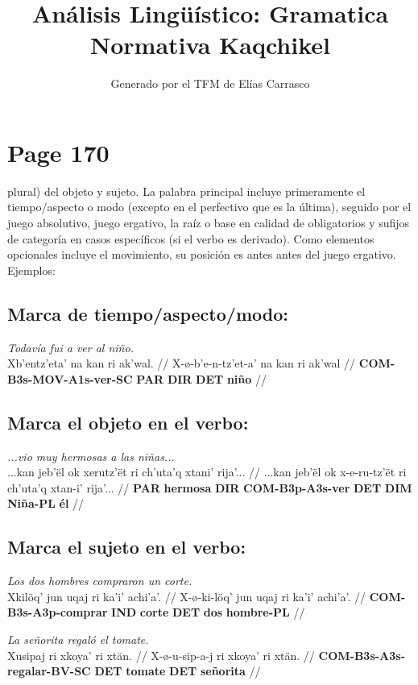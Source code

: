 \documentclass{article}%
\title{Análisis Lingüístico: Gramatica Normativa Kaqchikel}%
\author{Generado por el TFM de Elías Carrasco}%
\begin{document}
%
\normalsize%
\maketitle%
\section{Page 170}%
\label{sec:Page170}%
plural) del objeto y sujeto. La palabra principal incluye primeramente el tiempo/aspecto o modo (excepto en el perfectivo que es la última), seguido por el juego absolutivo, juego ergativo, la raíz o base en calidad de obligatorios y sufijos de categoría en casos específicos (si el verbo es derivado). Como elementos opcionales incluye el movimiento, su posición es antes antes del juego ergativo. Ejemplos: %
\subsection{Marca de tiempo/aspecto/modo:}%
\label{subsec:Marcadetiempo/aspecto/modo}%

%
\par\medskip%
\ex
\textit{Todavía fui a ver al niño.} \\
\begingl
\gla Xb'entz'eta' na kan ri ak'wal. //
\glb X-ø-b'e-n-tz'et-a' na kan ri ak'wal //
\glc \textbf{COM-B3s-MOV-A1s-ver-SC} \textbf{PAR} \textbf{DIR} \textbf{DET} \textbf{niño} //
\endgl
\xe
%
\medskip%
\subsection{Marca el objeto en el verbo:}%
\label{subsec:Marcaelobjetoenelverbo}%

%
\par\medskip%
\ex
\textit{...vio muy hermosas a las niñas...} \\
\begingl
\gla ...kan jeb'ël ok xerutz'ët ri ch'uta'q xtani' rija'... //
\glb ...kan jeb'ël ok x-e-ru-tz'ët ri ch'uta'q xtan-i' rija'... //
\glc \textbf{PAR} \textbf{hermosa} \textbf{DIR} \textbf{COM-B3p-A3s-ver} \textbf{DET} \textbf{DIM} \textbf{Niña-PL} \textbf{él} //
\endgl
\xe
%
\medskip%
\subsection{Marca el sujeto en el verbo:}%
\label{subsec:Marcaelsujetoenelverbo}%

%
\par\medskip%
\ex
\textit{Los dos hombres compraron un corte.} \\
\begingl
\gla Xkilöq' jun uqaj ri ka'i' achi'a'. //
\glb X-ø-ki-löq' jun uqaj ri ka'i' achi'a'. //
\glc \textbf{COM-B3s-A3p-comprar} \textbf{IND} \textbf{corte} \textbf{DET} \textbf{dos} \textbf{hombre-PL} //
\endgl
\xe
%
\medskip%
\par\medskip%
\ex
\textit{La señorita regaló el tomate.} \\
\begingl
\gla Xusipaj ri xkoya' ri xtän. //
\glb X-ø-u-sip-a-j ri xkoya' ri xtän. //
\glc \textbf{COM-B3s-A3s-regalar-BV-SC} \textbf{DET} \textbf{tomate} \textbf{DET} \textbf{señorita} //
\endgl
\xe
%
\medskip%
\end{document}
